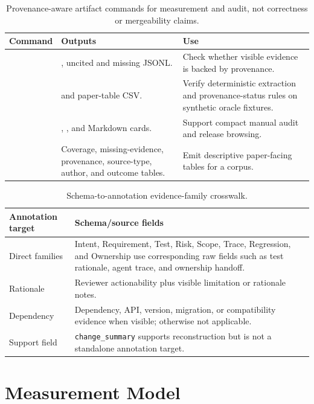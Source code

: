 \documentclass[10pt,conference]{IEEEtran}
\begin{document}
\begin{table}[t]
\centering
\caption{Provenance-aware artifact commands for measurement and audit, not correctness or mergeability claims.}
\label{tab:provenance-commands}
\footnotesize
\begin{tabular}{@{}L{0.22\textwidth}L{0.38\textwidth}L{0.34\textwidth}@{}}
\toprule
Command & Outputs & Use \\
\midrule
{} & , uncited and missing JSONL. & Check whether visible evidence is backed by provenance. \\
 &  and paper-table CSV. & Verify deterministic extraction and provenance-status rules on synthetic oracle fixtures. \\
 & , , and Markdown cards. & Support compact manual audit and release browsing. \\
 & Coverage, missing-evidence, provenance, source-type, author, and outcome tables. & Emit descriptive paper-facing tables for a corpus. \\
\bottomrule
\end{tabular}
\end{table}

\begin{table}[t]
\centering
\caption{Schema-to-annotation evidence-family crosswalk.}
\label{tab:evidence-crosswalk}
\footnotesize
\begin{tabular}{@{}L{0.26\columnwidth}L{0.68\columnwidth}@{}}
\toprule
Annotation target & Schema/source fields \\
\midrule
Direct families & Intent, Requirement, Test, Risk, Scope, Trace, Regression, and Ownership use corresponding raw fields such as test rationale, agent trace, and ownership handoff. \\
Rationale & Reviewer actionability plus visible limitation or rationale notes. \\
Dependency & Dependency, API, version, migration, or compatibility evidence when visible; otherwise not applicable. \\
Support field & \texttt{change\_summary} supports reconstruction but is not a standalone annotation target. \\
\bottomrule
\end{tabular}
\end{table}

\section{Measurement Model}
\end{document}
